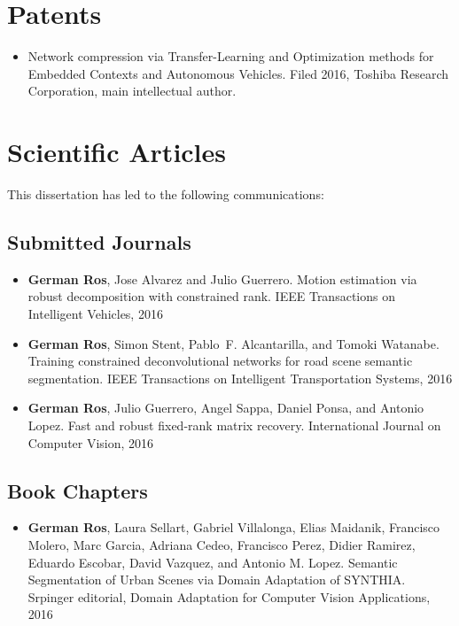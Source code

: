 \section{Patents}
\begin{itemize}
\item Network compression via Transfer-Learning and Optimization methods for Embedded Contexts and Autonomous Vehicles. Filed 2016, Toshiba Research Corporation, main intellectual author.
\end{itemize}

\section{Scientific Articles}

This dissertation has led to the following communications:

\subsection{Submitted Journals}
\begin{itemize}
	\item \textbf{German Ros}, Jose Alvarez and Julio Guerrero. Motion estimation via robust decomposition with
constrained rank. IEEE Transactions on Intelligent Vehicles, 2016
\item \textbf{German Ros}, Simon Stent, Pablo~F. Alcantarilla, and Tomoki Watanabe. Training constrained deconvolutional networks for road scene semantic segmentation. IEEE Transactions on Intelligent Transportation Systems, 2016
\item \textbf{German Ros}, Julio Guerrero, Angel Sappa, Daniel Ponsa, and Antonio Lopez. Fast and robust fixed-rank matrix recovery. International Journal on Computer Vision, 2016
\end{itemize}

\subsection{Book Chapters}
\begin{itemize}
\item \textbf{German Ros}, Laura Sellart, Gabriel Villalonga, Elias Maidanik, Francisco Molero, Marc Garcia, Adriana Cedeo, Francisco Perez, Didier Ramirez, Eduardo Escobar, David Vazquez, and Antonio M. Lopez. Semantic Segmentation of Urban Scenes via Domain Adaptation of SYNTHIA. Srpinger editorial, Domain Adaptation for Computer Vision Applications, 2016
\end{itemize}

